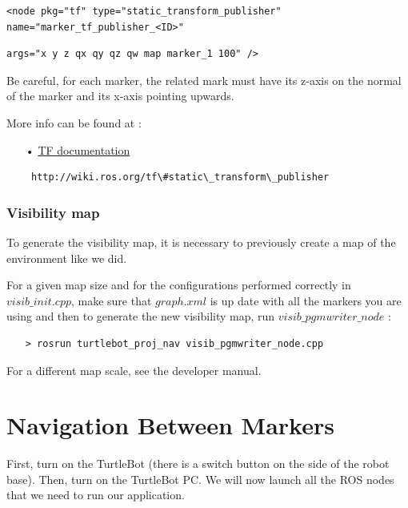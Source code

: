 \documentclass[10pt,a4paper]{article}
\begin{document}
\begin{verbatim}
<node pkg="tf" type="static_transform_publisher" name="marker_tf_publisher_<ID>" 
\end{verbatim}
\begin{verbatim}
args="x y z qx qy qz qw map marker_1 100" />
\end{verbatim}

Be careful, for each marker, the related mark must have its z-axis on the normal of the marker and its x-axis pointing upwards. 

More info can be found at :

\begin{itemize}
\item[•] \href{http://wiki.ros.org/tf\#static\_transform\_publisher}{TF documentation} 
\item[ ] \begin{verbatim} http://wiki.ros.org/tf\#static\_transform\_publisher \end{verbatim}
\end{itemize}

\subsubsection{Visibility map}
\label{sec:visibilityMap}

To generate the visibility map, it is necessary to previously create a map of the environment like we did.

For a given map size and for the configurations performed correctly in $ visib\_init.cpp $, make sure that $graph.xml$ is up date with all the markers you are using and then to generate the new visibility map, run $visib\_pgmwriter\_node$ :

\begin{itemize}
\item[]  \begin{verbatim}> rosrun turtlebot_proj_nav visib_pgmwriter_node.cpp \end{verbatim}
\end{itemize}

For a different map scale, see the developer manual.

\newpage
\section{Navigation Between Markers}
\label{sec:Navigation Between Markers}

First, turn on the TurtleBot (there is a switch button on the side of the robot base). Then, turn on the TurtleBot PC. We will now launch all the ROS nodes that we need to run our application.
\end{document}
